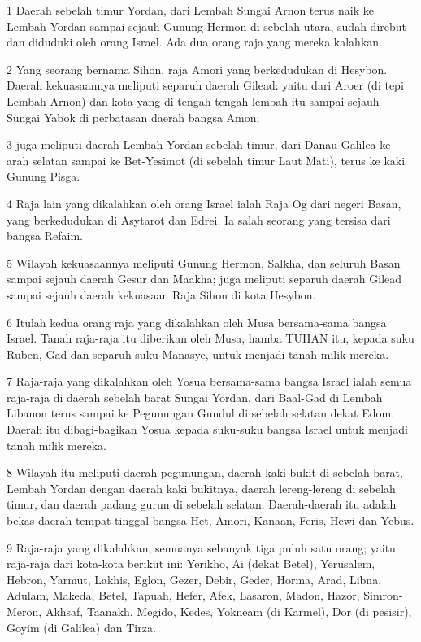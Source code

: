 \par 1 Daerah sebelah timur Yordan, dari Lembah Sungai Arnon terus naik ke Lembah Yordan sampai sejauh Gunung Hermon di sebelah utara, sudah direbut dan diduduki oleh orang Israel. Ada dua orang raja yang mereka kalahkan.
\par 2 Yang seorang bernama Sihon, raja Amori yang berkedudukan di Hesybon. Daerah kekuasaannya meliputi separuh daerah Gilead: yaitu dari Aroer (di tepi Lembah Arnon) dan kota yang di tengah-tengah lembah itu sampai sejauh Sungai Yabok di perbatasan daerah bangsa Amon;
\par 3 juga meliputi daerah Lembah Yordan sebelah timur, dari Danau Galilea ke arah selatan sampai ke Bet-Yesimot (di sebelah timur Laut Mati), terus ke kaki Gunung Pisga.
\par 4 Raja lain yang dikalahkan oleh orang Israel ialah Raja Og dari negeri Basan, yang berkedudukan di Asytarot dan Edrei. Ia salah seorang yang tersisa dari bangsa Refaim.
\par 5 Wilayah kekuasaannya meliputi Gunung Hermon, Salkha, dan seluruh Basan sampai sejauh daerah Gesur dan Maakha; juga meliputi separuh daerah Gilead sampai sejauh daerah kekuasaan Raja Sihon di kota Hesybon.
\par 6 Itulah kedua orang raja yang dikalahkan oleh Musa bersama-sama bangsa Israel. Tanah raja-raja itu diberikan oleh Musa, hamba TUHAN itu, kepada suku Ruben, Gad dan separuh suku Manasye, untuk menjadi tanah milik mereka.
\par 7 Raja-raja yang dikalahkan oleh Yosua bersama-sama bangsa Israel ialah semua raja-raja di daerah sebelah barat Sungai Yordan, dari Baal-Gad di Lembah Libanon terus sampai ke Pegunungan Gundul di sebelah selatan dekat Edom. Daerah itu dibagi-bagikan Yosua kepada suku-suku bangsa Israel untuk menjadi tanah milik mereka.
\par 8 Wilayah itu meliputi daerah pegunungan, daerah kaki bukit di sebelah barat, Lembah Yordan dengan daerah kaki bukitnya, daerah lereng-lereng di sebelah timur, dan daerah padang gurun di sebelah selatan. Daerah-daerah itu adalah bekas daerah tempat tinggal bangsa Het, Amori, Kanaan, Feris, Hewi dan Yebus.
\par 9 Raja-raja yang dikalahkan, semuanya sebanyak tiga puluh satu orang; yaitu raja-raja dari kota-kota berikut ini: Yerikho, Ai (dekat Betel), Yerusalem, Hebron, Yarmut, Lakhis, Eglon, Gezer, Debir, Geder, Horma, Arad, Libna, Adulam, Makeda, Betel, Tapuah, Hefer, Afek, Lasaron, Madon, Hazor, Simron-Meron, Akhsaf, Taanakh, Megido, Kedes, Yokneam (di Karmel), Dor (di pesisir), Goyim (di Galilea) dan Tirza.


